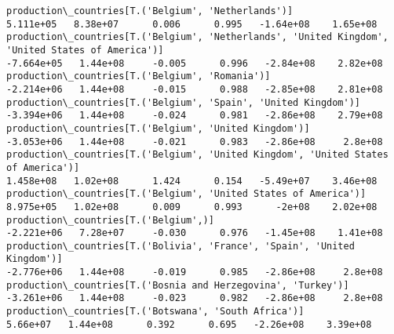 \documentclass[11pt]{article}
\begin{document}
\begin{Verbatim}[commandchars=\\\{\}]
production\_countries[T.('Belgium', 'Netherlands')]                                                                                                                                     5.111e+05   8.38e+07      0.006      0.995   -1.64e+08    1.65e+08
production\_countries[T.('Belgium', 'Netherlands', 'United Kingdom', 'United States of America')]                                                                                      -7.664e+05   1.44e+08     -0.005      0.996   -2.84e+08    2.82e+08
production\_countries[T.('Belgium', 'Romania')]                                                                                                                                        -2.214e+06   1.44e+08     -0.015      0.988   -2.85e+08    2.81e+08
production\_countries[T.('Belgium', 'Spain', 'United Kingdom')]                                                                                                                        -3.394e+06   1.44e+08     -0.024      0.981   -2.86e+08    2.79e+08
production\_countries[T.('Belgium', 'United Kingdom')]                                                                                                                                 -3.053e+06   1.44e+08     -0.021      0.983   -2.86e+08     2.8e+08
production\_countries[T.('Belgium', 'United Kingdom', 'United States of America')]                                                                                                      1.458e+08   1.02e+08      1.424      0.154   -5.49e+07    3.46e+08
production\_countries[T.('Belgium', 'United States of America')]                                                                                                                        8.975e+05   1.02e+08      0.009      0.993      -2e+08    2.02e+08
production\_countries[T.('Belgium',)]                                                                                                                                                  -2.221e+06   7.28e+07     -0.030      0.976   -1.45e+08    1.41e+08
production\_countries[T.('Bolivia', 'France', 'Spain', 'United Kingdom')]                                                                                                              -2.776e+06   1.44e+08     -0.019      0.985   -2.86e+08     2.8e+08
production\_countries[T.('Bosnia and Herzegovina', 'Turkey')]                                                                                                                          -3.261e+06   1.44e+08     -0.023      0.982   -2.86e+08     2.8e+08
production\_countries[T.('Botswana', 'South Africa')]                                                                                                                                    5.66e+07   1.44e+08      0.392      0.695   -2.26e+08    3.39e+08

\end{Verbatim}
\end{document}
